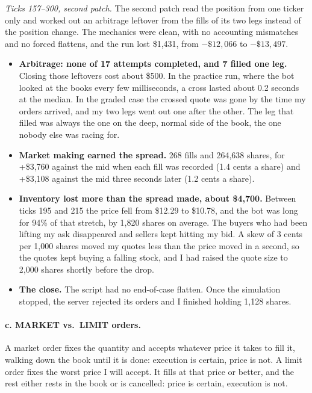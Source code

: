 \emph{Ticks 157--300, second patch.} The second patch read the position from one
ticker only and worked out an arbitrage leftover from the fills of its two legs
instead of the position change. The mechanics were clean, with no accounting
mismatches and no forced flattens, and the run lost \$1{,}431, from $-\$12{,}066$ to
$-\$13{,}497$.
\begin{itemize}
  \item \textbf{Arbitrage: none of 17 attempts completed, and 7 filled one leg.}
        Closing those leftovers cost about \$500. In the practice run, where the bot
        looked at the books every few milliseconds, a cross lasted about 0.2 seconds
        at the median. In the graded case the crossed quote was gone by the time my
        orders arrived, and my two legs went out one after the other. The leg that
        filled was always the one on the deep, normal side of the book, the one
        nobody else was racing for.
  \item \textbf{Market making earned the spread.} 268 fills and 264{,}638 shares, for
        +\$3{,}760 against the mid when each fill was recorded (1.4 cents a share)
        and +\$3{,}108 against the mid three seconds later (1.2 cents a share).
  \item \textbf{Inventory lost more than the spread made, about \$4{,}700.} Between
        ticks 195 and 215 the price fell from \$12.29 to \$10.78, and the bot was
        long for 94\% of that stretch, by 1{,}820 shares on average. The buyers who
        had been lifting my ask disappeared and sellers kept hitting my bid. A skew
        of 3 cents per 1{,}000 shares moved my quotes less than the price moved in a
        second, so the quotes kept buying a falling stock, and I had raised the quote
        size to 2{,}000 shares shortly before the drop.
  \item \textbf{The close.} The script had no end-of-case flatten. Once the
        simulation stopped, the server rejected its orders and I finished holding
        1{,}128 shares.
\end{itemize}

\paragraph{c. MARKET vs.\ LIMIT orders.}
A market order fixes the quantity and accepts whatever price it takes to fill it,
walking down the book until it is done: execution is certain, price is not. A limit
order fixes the worst price I will accept. It fills at that price or better, and the
rest either rests in the book or is cancelled: price is certain, execution is not.

